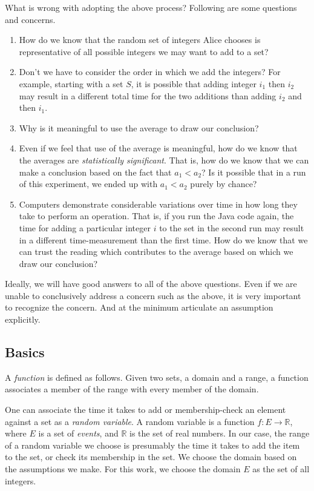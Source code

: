 What is wrong with adopting the above process? Following are some
questions and concerns.

\begin{enumerate}
    \item How do we know that the random set of integers Alice chooses
	is representative of all possible integers we may want to
	add to a set?
    \item Don't we have to consider the order in which we add
	the integers? For example, starting with a set $S$, it
	is possible that adding integer $i_1$ then $i_2$ may
	result in a different total time for the two additions
	than adding $i_2$ and then $i_1$.
    \item Why is it meaningful to use the average to draw our
	conclusion?
    \item Even if we feel that use of the average is meaningful,
	how do we know that the averages are \emph{statistically
	significant}. That is, how do we know that we can make a
	conclusion based on the fact that $a_1 < a_2$? Is it possible
	that in a run of this experiment, we ended up with
	$a_1 < a_2$ purely by chance?
    \item Computers demonstrate considerable variations over
	time in how long they take to perform an operation. That is,
	if you run the Java code again, the time for adding a 
	particular integer $i$ to the set in the second run may
	result in a different time-measurement than the first time.
	How do we know that we can trust the reading which contributes
	to the average based on which we draw our conclusion?
\end{enumerate}

Ideally, we will have good answers to all of the above questions.
Even if we are unable to conclusively address a concern such
as the above, it is very important to recognize the concern. And
at the minimum articulate an assumption explicitly.

\subsection{Basics} \label{sec:statistics:basics}
A \emph{function} is defined as follows. Given two sets,
a domain and a range, a function associates a member of the
range with every member of the domain.

One can associate the time it takes to add or membership-check
an element against a set as a \emph{random variable}.
A random variable is a function
$f\!\! : E \longrightarrow \mathbb{R}$, where $E$ is a set
of \emph{events}, and $\mathbb{R}$ is the set of 
real numbers. In our case, the range of a random variable
we choose is presumably the time it takes to add
the item to the set, or check its membership in the set.
We choose the domain based on the assumptions we make.
For this work, we choose the domain $E$ as the set
of all integers.

